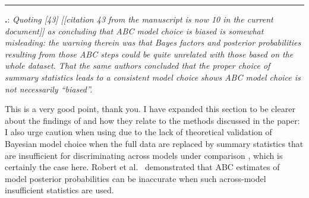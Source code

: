 \documentclass[12pt]{article}
\newcounter{commentCounter}
\newcommand{\revcomment}[1]{{\addtocounter{commentCounter}{1}}
    \medskip \hrule \noindent
\textbf{\arabic{section}.\arabic{commentCounter}}: {\sl #1}\par\xspace}
\newcommand{\response}[1]{{\addtolength{\leftskip}{0.25in} #1\par}\xspace}
\let\quoteOld\quote
\let\endquoteOld\endquote
\renewenvironment{quote}{\sffamily\small\quoteOld}{\endquoteOld}
\begin{document}
\revcomment{
    Quoting [43] [[citation 43 from the manuscript is now 10 in the current
    document]] as concluding that ABC model choice is biased is somewhat
    misleading: the warning therein was that Bayes factors and posterior
    probabilities resulting from those ABC steps could be quite unrelated with
    those based on the whole dataset. That the same authors concluded that the
    proper choice of summary statistics leads to a consistent model choice
    shows ABC model choice is not necessarily ``biased''.
}
\response{
    This is a very good point, thank you. I have expanded this section to be
    clearer about the findings of \cite{Robert2011} and how they relate to the
    methods discussed in the paper:
    \begin{quote}
        I also urge caution when using \dppmsbayes due to the lack of
        theoretical validation of Bayesian model choice when the full data are
        replaced by summary statistics that are insufficient for discriminating
        across models under comparison \cite{Robert2011}, which is certainly
        the case here.  Robert et al.\ \cite{Robert2011} demonstrated that ABC
        estimates of model posterior probabilities can be inaccurate when such
        across-model insufficient statistics are used.
    \end{quote}
}
\end{document}
